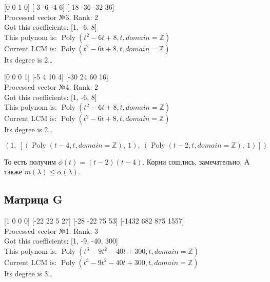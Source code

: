 \documentclass[12pt, a4paper]{article}
\begin{document}
    [0 0 1 0] [ 3 -6 -4  6] [ 18 -36 -32  36] \\
    Processed vector №3. Rank: 2\\
    Got this coefficients: [1, -6, 8]\\
    This polynom is: $\operatorname{Poly}{\left( t^{2} - 6 t + 8, t, domain=\mathbb{Z} \right)}$\\
    Current LCM is: $\operatorname{Poly}{\left( t^{2} - 6 t + 8, t, domain=\mathbb{Z} \right)}$\\
    Its degree is 2…
    
    [0 0 0 1] [-5  4 10  4] [-30  24  60  16] \\
    Processed vector №4. Rank: 2\\
    Got this coefficients: [1, -6, 8]\\
    This polynom is: $\operatorname{Poly}{\left( t^{2} - 6 t + 8, t, domain=\mathbb{Z} \right)}$\\
    Current LCM is: $\operatorname{Poly}{\left( t^{2} - 6 t + 8, t, domain=\mathbb{Z} \right)}$\\
    Its degree is 2…
    
    \begin{equation}\left( 1, \  \left[ \left( \operatorname{Poly}{\left( t - 4, t, domain=\mathbb{Z} \right)}, \  1\right), \  \left( \operatorname{Poly}{\left( t - 2, t, domain=\mathbb{Z} \right)}, \  1\right)\right]\right)\end{equation}
    
    То есть получим $\phi(t) = (t - 2)(t - 4)$.
    Корни сошлись, замечательно. А также $m(\lambda) \leqslant \alpha(\lambda)$.



    \subsection{Матрица G}

    [1 0 0 0] [-22  22   5  27] [-28 -22  75  53] [-1432   682   875  1557] \\
    Processed vector №1. Rank: 3\\
    Got this coefficients: [1, -9, -40, 300]\\
    This polynom is: $\operatorname{Poly}{\left( t^{3} - 9 t^{2} - 40 t + 300, t, domain=\mathbb{Z} \right)}$\\
    Current LCM is: $\operatorname{Poly}{\left( t^{3} - 9 t^{2} - 40 t + 300, t, domain=\mathbb{Z} \right)}$\\
    Its degree is 3…
    
\end{document}
